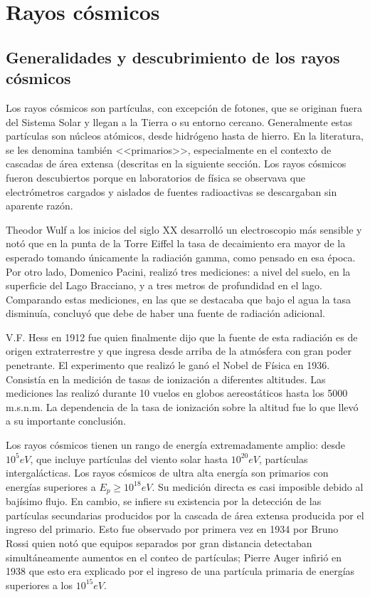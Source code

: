 \documentclass{book}
\begin{document}
\section{Rayos c\'osmicos}
\subsection{Generalidades y descubrimiento de los rayos c\'osmicos}
Los rayos c\'osmicos son part\'iculas, con excepci\'on de fotones, que se originan fuera del Sistema Solar y llegan a la Tierra o su entorno cercano. Generalmente estas part\'iculas son n\'ucleos at\'omicos, desde hidr\'ogeno hasta de hierro. En la literatura, se les denomina tambi\'en <<primarios>>, especialmente en el contexto de cascadas de \'area extensa (descritas en la siguiente secci\'on. Los rayos c\'osmicos fueron descubiertos porque en laboratorios de f\'isica se observava que electr\'ometros cargados y aislados de fuentes radioactivas se descargaban sin aparente raz\'on. \citep{ASOREY}

Theodor Wulf a los inicios del siglo XX desarroll\'o un electroscopio m\'as sensible y not\'o que en la punta de la Torre Eiffel la tasa de decaimiento era mayor de la esperado tomando \'unicamente la radiaci\'on gamma, como pensado en esa \'epoca. Por otro lado, Domenico Pacini, realiz\'o tres mediciones: a nivel del suelo, en la superficie del Lago Bracciano, y a tres metros de profundidad en el lago. Comparando estas mediciones, en las que se destacaba que bajo el agua la tasa disminu\'ia, concluy\'o que debe de haber una fuente de radiaci\'on adicional. \citep{ASOREY}

V.F. Hess en 1912 fue quien finalmente dijo que la fuente de esta radiaci\'on es de origen extraterrestre y que ingresa desde arriba de la atm\'osfera con gran poder penetrante. El experimento que realiz\'o le gan\'o el Nobel de F\'isica en 1936. Consist\'ia en la medici\'on de tasas de ionizaci\'on a diferentes altitudes. Las mediciones las realiz\'o durante 10 vuelos en globos aereost\'aticos hasta los 5000 m.s.n.m. La dependencia de la tasa de ionizaci\'on sobre la altitud fue lo que llev\'o a su importante conclusi\'on. \citep{ASOREY}

Los rayos c\'osmicos tienen un rango de energ\'ia extremadamente amplio: desde $10^5 eV$, que incluye part\'iculas del viento solar hasta $10^20 eV$, part\'iculas intergal\'acticas. Los rayos c\'osmicos de ultra alta energ\'ia son primarios con energ\'ias superiores a $E_p \geq 10^18 eV$. Su medici\'on directa es casi imposible debido al baj\'isimo flujo. En cambio, se infiere su existencia por la detecci\'on de las part\'iculas secundarias producidos por la cascada de \'area extensa producida por el ingreso del primario. Esto fue observado por primera vez en 1934 por Bruno Rossi quien not\'o que equipos separados por gran distancia detectaban simult\'aneamente aumentos en el conteo de part\'iculas; Pierre Auger infiri\'o en 1938 que esto era explicado por el ingreso de una part\'icula primaria de energ\'ias superiores a los $10^15 eV$. \citep{ASOREY}
\end{document}
